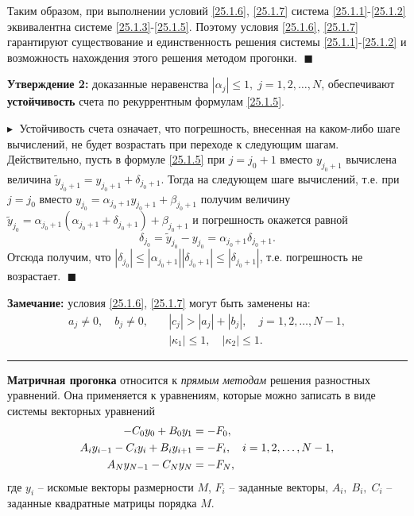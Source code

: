 Таким образом, при выполнении условий \eqref{25.1.6}, \eqref{25.1.7} система \eqref{25.1.1}-\eqref{25.1.2} эквивалентна системе \eqref{25.1.3}-\eqref{25.1.5}. Поэтому условия \eqref{25.1.6}, \eqref{25.1.7} гарантируют существование и единственность решения системы \eqref{25.1.1}-\eqref{25.1.2} и возможность нахождения этого решения методом прогонки. $\;\blacksquare$

\textbf{Утверждение 2:\;} доказанные неравенства $|\alpha_j| \leq 1, \; j = 1, 2, \ldots, N$, обеспечивают \textbf{устойчивость} счета по рекуррентным формулам \eqref{25.1.5}. 

$\blacktriangleright\;$ Устойчивость счета означает, что погрешность, внесенная на каком-либо шаге вычислений, не будет возрастать при переходе к следующим шагам. Действительно, пусть в формуле \eqref{25.1.5} при $j = j_0 + 1$ вместо $y_{j_0+1}$ вычислена величина $\widetilde{y}_{j_0+1} = y_{j_0+1} + \delta_{j_0+1}$. Тогда на следующем шаге вычислений, т.е. при $j = j_0$ вместо $y_{j_0} = \alpha_{j_0+1}y_{j_0+1} + \beta_{j_0+1}$ получим величину $\widetilde{y}_{j_0} = \alpha_{j_0+1}(\alpha_{j_0+1} + \delta_{j_0+1}) + \beta_{j_0+1}$ и погрешность окажется равной 
$$
\delta_{j_0} = \widetilde{y}_{j_0} - y_{j_0} = \alpha_{j_0+1}\delta_{j_0+1}.
$$
Отсюда получим, что $|\delta_{j_0}| \leq |\alpha_{j_0+1}| |\delta_{j_0+1}| \leq |\delta_{j_0+1}| $, т.е. погрешность не возрастает. $\;\blacksquare$

\textbf{Замечание:} условия \eqref{25.1.6}, \eqref{25.1.7} могут быть заменены на: 
\begin{align*} 
    a_j \ne 0, \quad b_j \ne 0,\quad &|c_j| > |a_j| + |b_j|, \quad j = 1, 2, \ldots, N-1,\\
    &|\kappa_1| \leq 1, \quad |\kappa_2| \leq 1.
\end{align*}

\rule{275pt}{0.5pt} 

\textbf{Матричная прогонка} относится к \textit{прямым методам} решения разностных уравнений. Она применяется к уравнениям, которые можно записать в виде системы векторных уравнений 
\begin{align}
    -C_0 y_0 + B_0 y_1 &= - F_0,\notag \\
    A_i y_{i-1} - C_i y_i + B_i y_{i+1} &= - F_i, \quad i = 1, 2, \ldots, N-1, \label{25.1}\\
    A_N y_{N-1} - C_N y_N &= - F_N,\notag
\end{align}
где $y_i$ -- искомые векторы размерности $M$, $F_i$ -- заданные векторы, $A_i, \; B_i, \; C_i$ -- заданные квадратные матрицы порядка $M$.

